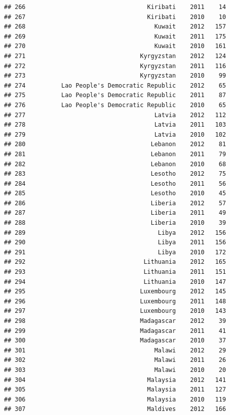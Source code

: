 \documentclass[
]{book}
\begin{document}
\begin{verbatim}
## 266                                  Kiribati    2011    14
## 267                                  Kiribati    2010    10
## 268                                    Kuwait    2012   157
## 269                                    Kuwait    2011   175
## 270                                    Kuwait    2010   161
## 271                                Kyrgyzstan    2012   124
## 272                                Kyrgyzstan    2011   116
## 273                                Kyrgyzstan    2010    99
## 274          Lao People's Democratic Republic    2012    65
## 275          Lao People's Democratic Republic    2011    87
## 276          Lao People's Democratic Republic    2010    65
## 277                                    Latvia    2012   112
## 278                                    Latvia    2011   103
## 279                                    Latvia    2010   102
## 280                                   Lebanon    2012    81
## 281                                   Lebanon    2011    79
## 282                                   Lebanon    2010    68
## 283                                   Lesotho    2012    75
## 284                                   Lesotho    2011    56
## 285                                   Lesotho    2010    45
## 286                                   Liberia    2012    57
## 287                                   Liberia    2011    49
## 288                                   Liberia    2010    39
## 289                                     Libya    2012   156
## 290                                     Libya    2011   156
## 291                                     Libya    2010   172
## 292                                 Lithuania    2012   165
## 293                                 Lithuania    2011   151
## 294                                 Lithuania    2010   147
## 295                                Luxembourg    2012   145
## 296                                Luxembourg    2011   148
## 297                                Luxembourg    2010   143
## 298                                Madagascar    2012    39
## 299                                Madagascar    2011    41
## 300                                Madagascar    2010    37
## 301                                    Malawi    2012    29
## 302                                    Malawi    2011    26
## 303                                    Malawi    2010    20
## 304                                  Malaysia    2012   141
## 305                                  Malaysia    2011   127
## 306                                  Malaysia    2010   119
## 307                                  Maldives    2012   166

\end{verbatim}
\end{document}
